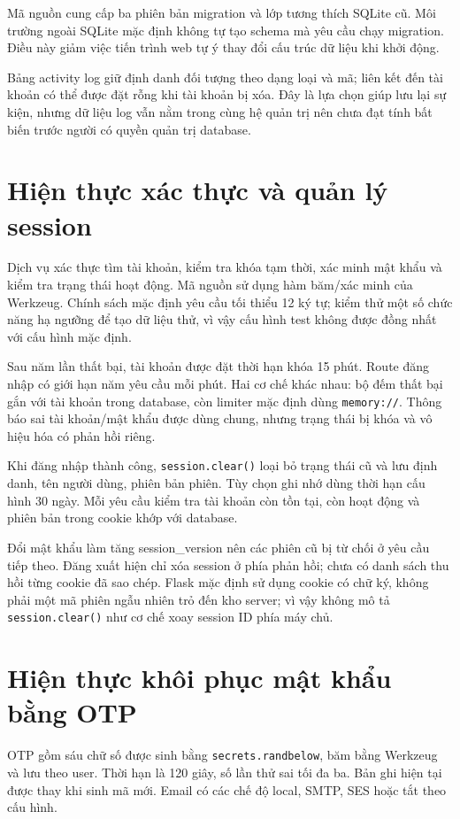 Mã nguồn cung cấp ba phiên bản migration và lớp tương thích SQLite cũ. Môi trường ngoài SQLite mặc định không tự tạo schema mà yêu cầu chạy migration. Điều này giảm việc tiến trình web tự ý thay đổi cấu trúc dữ liệu khi khởi động.

Bảng activity log giữ định danh đối tượng theo dạng loại và mã; liên kết đến tài khoản có thể được đặt rỗng khi tài khoản bị xóa. Đây là lựa chọn giúp lưu lại sự kiện, nhưng dữ liệu log vẫn nằm trong cùng hệ quản trị nên chưa đạt tính bất biến trước người có quyền quản trị database.

\section{Hiện thực xác thực và quản lý session}
Dịch vụ xác thực tìm tài khoản, kiểm tra khóa tạm thời, xác minh mật khẩu và kiểm tra trạng thái hoạt động. Mã nguồn sử dụng hàm băm/xác minh của Werkzeug. Chính sách mặc định yêu cầu tối thiểu 12 ký tự; kiểm thử một số chức năng hạ ngưỡng để tạo dữ liệu thử, vì vậy cấu hình test không được đồng nhất với cấu hình mặc định.

Sau năm lần thất bại, tài khoản được đặt thời hạn khóa 15 phút. Route đăng nhập có giới hạn năm yêu cầu mỗi phút. Hai cơ chế khác nhau: bộ đếm thất bại gắn với tài khoản trong database, còn limiter mặc định dùng \texttt{memory://}. Thông báo sai tài khoản/mật khẩu được dùng chung, nhưng trạng thái bị khóa và vô hiệu hóa có phản hồi riêng.

Khi đăng nhập thành công, \texttt{session.clear()} loại bỏ trạng thái cũ và lưu định danh, tên người dùng, phiên bản phiên. Tùy chọn ghi nhớ dùng thời hạn cấu hình 30 ngày. Mỗi yêu cầu kiểm tra tài khoản còn tồn tại, còn hoạt động và phiên bản trong cookie khớp với database.

Đổi mật khẩu làm tăng session\_version nên các phiên cũ bị từ chối ở yêu cầu tiếp theo. Đăng xuất hiện chỉ xóa session ở phía phản hồi; chưa có danh sách thu hồi từng cookie đã sao chép. Flask mặc định sử dụng cookie có chữ ký, không phải một mã phiên ngẫu nhiên trỏ đến kho server; vì vậy không mô tả \texttt{session.clear()} như cơ chế xoay session ID phía máy chủ.

\section{Hiện thực khôi phục mật khẩu bằng OTP}
OTP gồm sáu chữ số được sinh bằng \texttt{secrets.randbelow}, băm bằng Werkzeug và lưu theo user. Thời hạn là 120 giây, số lần thử sai tối đa ba. Bản ghi hiện tại được thay khi sinh mã mới. Email có các chế độ local, SMTP, SES hoặc tắt theo cấu hình.

